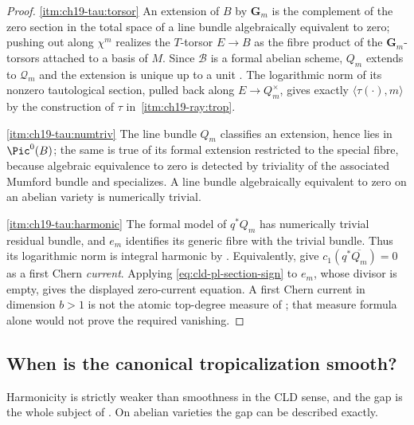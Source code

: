 \begin{proof}
\cref{itm:ch19-tau:torsor} An extension of $B$ by $\mathbf G_m$ is the
complement of the zero section in the total space of a line bundle
algebraically equivalent to zero; pushing out along $\chi^m$ realizes the
$T$-torsor $E\to B$ as the fibre product of the $\mathbf G_m$-torsors
attached to a basis of $M$.  Since $\mathcal B$ is a formal abelian scheme,
$Q_m$ extends to $\mathcal Q_m$ and the extension is unique up to a unit
\cite[Lemma~B.2.2 and Remark~19.2.3]{CLD25}.  The logarithmic norm of its
nonzero tautological section, pulled back along $E\to Q_m^\times$, gives exactly
$\langle\tau(\cdot),m\rangle$ by the construction of $\tau$ in
\,\cref{itm:ch19-ray:trop}.

\cref{itm:ch19-tau:numtriv} The line bundle $Q_m$ classifies an extension,
hence lies in $\Pic^0(B)$; the same is true of its formal extension
restricted to the special fibre, because algebraic equivalence to zero is
detected by triviality of the associated Mumford bundle and specializes.  A
line bundle algebraically equivalent to zero on an abelian variety is
numerically trivial.

\cref{itm:ch19-tau:harmonic} The formal model of $q^*Q_m$ has
numerically trivial residual bundle, and $e_m$ identifies its generic fibre
with the trivial bundle.  Thus its logarithmic norm is integral harmonic
by \cite[Lemma~7.4 and Proposition~16.2]{GJR26}.  Equivalently,
\cite[Theorem~18.8.4 and Remark~19.2.3]{CLD25} give
$c_1(q^*\overline{Q_m})=0$ as a first Chern \emph{current}.  Applying
\eqref{eq:cld-pl-section-sign} to $e_m$, whose divisor is empty, gives the
displayed zero-current equation.  A first Chern current in dimension
$b>1$ is not the atomic top-degree measure of
; that measure formula alone would not prove
the required vanishing.
\end{proof}

\subsection{When is the canonical tropicalization smooth?}
\label{sec:ch19-tau-smooth}

Harmonicity is strictly weaker than smoothness in the CLD sense, and the
gap is the whole subject of .  On abelian varieties
the gap can be described exactly.

